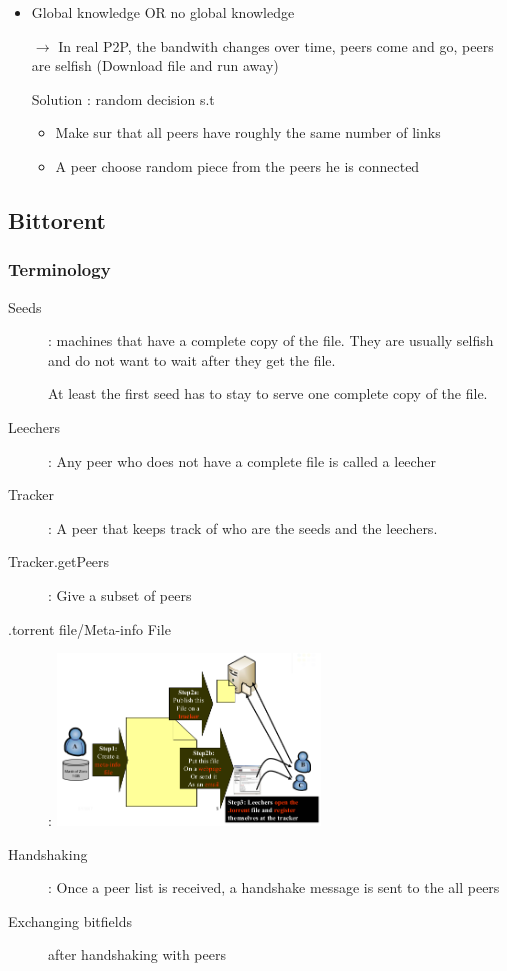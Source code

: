 \begin{itemize}
\item Global knowledge OR no global knowledge
\item[$\to$] In real P2P, the bandwith changes over time, peers come and go,
peers are selfish (Download file and run away)

\item[Solution]: random decision s.t
\begin{itemize}
\item Make sur that all peers have roughly the same number of links
\item A peer choose random piece from the peers he is connected
\end{itemize}
\end{itemize}

\subsection{Bittorent}

\subsubsection{Terminology}
\begin{description}
\item[Seeds]: machines that have a complete copy of the file. They are usually selfish and do not want to
wait after they get the file.

At least the first seed has to stay to serve
one complete copy of the file.

\item[Leechers]: Any peer who does not have a complete file
is called a leecher
\item[Tracker]: A peer that keeps track of who are the seeds and the leechers.
\item[Tracker.getPeers]: Give a subset of peers
\item[.torrent file/Meta-info File]: \includegraphics[width=7cm]{img/torrent.png}
\item[Handshaking]: Once a peer list is received, a handshake message
is sent to the all peers
\item[Exchanging bitfields] after handshaking with peers

\end{description}

